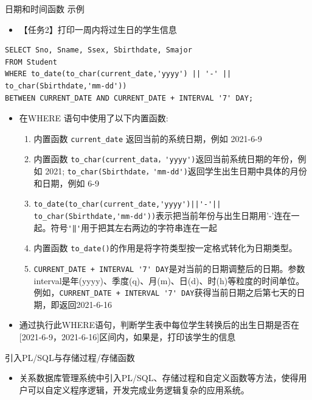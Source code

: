 \begin{frame}{日期和时间函数 示例}
    \begin{itemize}
        \item 【任务2】打印一周内将过生日的学生信息
    \end{itemize}

\begin{block}{}
\begin{lstlisting}
SELECT Sno, Sname, Ssex, Sbirthdate, Smajor 
FROM Student 
WHERE to_date(to_char(current_date,'yyyy') || '-' || to_char(Sbirthdate,'mm-dd')) 
BETWEEN CURRENT_DATE AND CURRENT_DATE + INTERVAL '7' DAY;
\end{lstlisting}
\end{block} 
\begin{itemize}
    \item 在WHERE 语句中使用了以下内置函数:
    \begin{enumerate}
        \item 内置函数 \lstinline{current_date} 返回当前的系统日期，例如 2021-6-9
        \item 内置函数 \lstinline{to_char(current_data，'yyyy')}返回当前系统日期的年份，例如 2021; \lstinline{to_char(Sbirthdate，'mm-dd')}返回学生出生日期中具体的月份和日期，例如 6-9
        \item \lstinline{to_date(to_char(current_date,'yyyy')||'-'|| to_char(Sbirthdate,'mm-dd'))}表示把当前年份与出生日期用'-'连在一起。符号\lstinline{'‖'}用于把其左右两边的字符串连在一起
        \item 内置函数 \lstinline{to_date()}的作用是将字符类型按一定格式转化为日期类型。
        \item \lstinline{CURRENT_DATE + INTERVAL '7' DAY}是对当前的日期调整后的日期。参数interval是年(yyyy)、季度(q)、月(m)、日(d)、时(h)等粒度的时间单位。例如，\lstinline{CURRENT_DATE + INTERVAL '7' DAY}获得当前日期之后第七天的日期，即返回2021-6-16
    \end{enumerate}
    \item 通过执行此WHERE语句，判断学生表中每位学生转换后的出生日期是否在[2021-6-9，2021-6-16]区间内，如果是，打印该学生的信息
\end{itemize}
\end{frame}

\begin{frame}{引入PL/SQL与存储过程/存储函数}
    \begin{itemize}
        \item 关系数据库管理系统中引入PL/SQL、存储过程和自定义函数等方法，使得用户可以自定义程序逻辑，开发完成业务逻辑复杂的应用系统。
    \end{itemize}
\end{frame}

